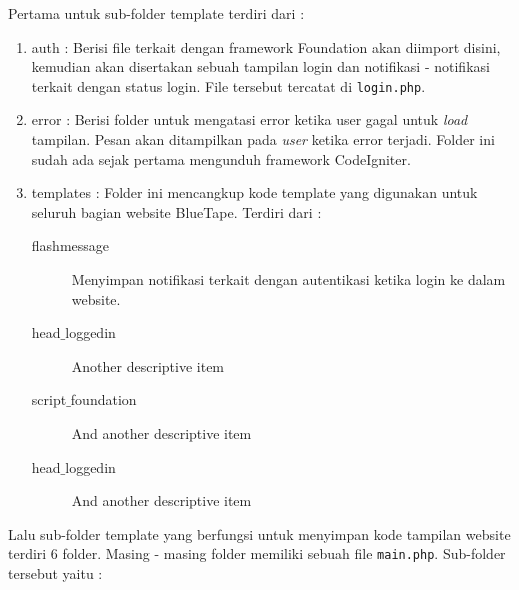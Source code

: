 Pertama untuk sub-folder template terdiri dari : 
\begin{enumerate}
	\item auth	: Berisi file terkait dengan framework Foundation akan diimport disini, kemudian akan disertakan sebuah tampilan login dan notifikasi - notifikasi terkait dengan status login. File tersebut tercatat di \texttt{login.php}.
	\item error	: Berisi folder untuk mengatasi error ketika user gagal untuk \textit{load} tampilan. Pesan akan ditampilkan pada \textit{user} ketika error terjadi. Folder ini sudah ada sejak pertama mengunduh framework CodeIgniter.
	\item templates	: Folder ini mencangkup kode template yang digunakan untuk seluruh bagian website BlueTape. Terdiri dari :
	\begin{description}
		\item [flashmessage] Menyimpan notifikasi terkait dengan autentikasi ketika login ke dalam website.
		\item [head$\_$loggedin] Another descriptive item
		\item [script$\_$foundation] And another descriptive item
		\item [head$\_$loggedin] And another descriptive item
	\end{description}
\end{enumerate}

Lalu sub-folder template yang berfungsi untuk menyimpan kode tampilan website terdiri 6 folder. Masing - masing folder memiliki sebuah file \texttt{main.php}. Sub-folder tersebut yaitu :

